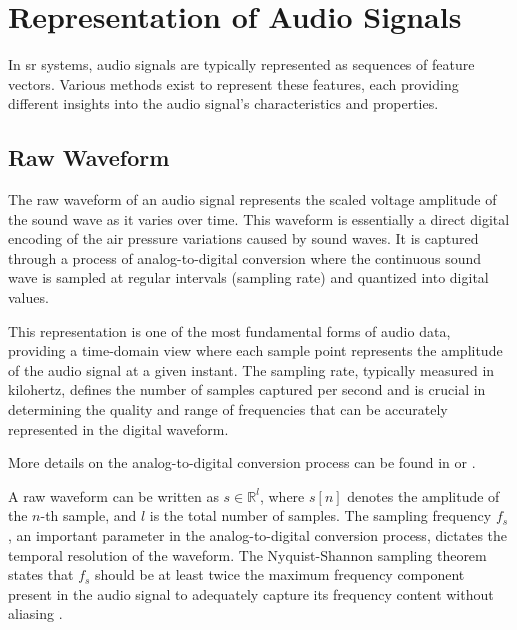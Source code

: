 

\section{Representation of Audio Signals}

In \gls{sr} systems, audio signals are typically represented as sequences of feature vectors. Various methods exist to represent these features, each providing different insights into the audio signal's characteristics and properties.

\subsection{Raw Waveform}
The raw waveform of an audio signal represents the scaled voltage amplitude of the sound wave as it varies over time. This waveform is essentially a direct digital encoding of the air pressure variations caused by sound waves. It is captured through a process of analog-to-digital conversion where the continuous sound wave is sampled at regular intervals (sampling rate) and quantized into digital values.

This representation is one of the most fundamental forms of audio data, providing a time-domain view where each sample point represents the amplitude of the audio signal at a given instant. The sampling rate, typically measured in kilohertz, defines the number of samples captured per second and is crucial in determining the quality and range of frequencies that can be accurately represented in the digital waveform.

More details on the analog-to-digital conversion process can be found in \cite{lyons2010understanding} or \cite{oppenheim1996signals}.

A raw waveform can be written as \({s} \in \mathbb{R}^l\), where \({s}[n]\) denotes the amplitude of the \(n\)-th sample, and \(l\) is the total number of samples. The sampling frequency \(f_s\), an important parameter in the analog-to-digital conversion process, dictates the temporal resolution of the waveform. The Nyquist-Shannon sampling theorem states that \(f_s\) should be at least twice the maximum frequency component present in the audio signal to adequately capture its frequency content without aliasing \cite{Nyquist1928, Shannon1949}.

